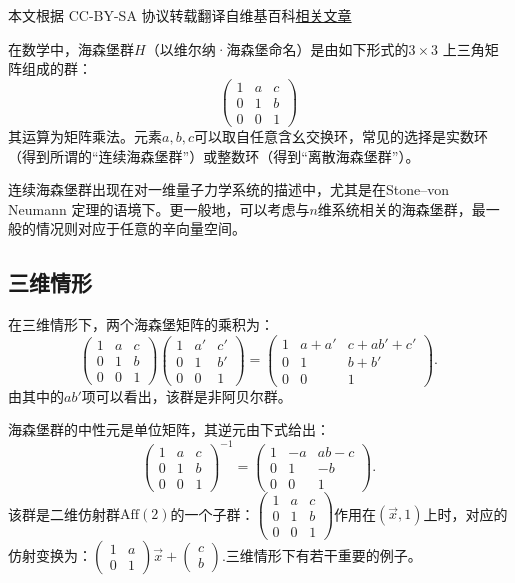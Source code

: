
本文根据 CC-BY-SA 协议转载翻译自维基百科\href{https://en.wikipedia.org/wiki/Heisenberg_group}{相关文章}

在数学中，海森堡群$H$（以维尔纳·海森堡命名）是由如下形式的$3 \times 3$ 上三角矩阵组成的群：
$$
\begin{pmatrix}
1 & a & c \\
0 & 1 & b \\
0 & 0 & 1
\end{pmatrix}~
$$
其运算为矩阵乘法。元素$a, b, c$可以取自任意含幺交换环，常见的选择是实数环（得到所谓的“连续海森堡群”）或整数环（得到“离散海森堡群”）。

连续海森堡群出现在对一维量子力学系统的描述中，尤其是在Stone–von Neumann 定理的语境下。更一般地，可以考虑与$n$维系统相关的海森堡群，最一般的情况则对应于任意的辛向量空间。
\subsection{三维情形}
在三维情形下，两个海森堡矩阵的乘积为：
$$
\begin{pmatrix}
1 & a & c \\
0 & 1 & b \\
0 & 0 & 1
\end{pmatrix}
\begin{pmatrix}
1 & a' & c' \\
0 & 1 & b' \\
0 & 0 & 1
\end{pmatrix}
=
\begin{pmatrix}
1 & a + a' & c + ab' + c' \\
0 & 1 & b + b' \\
0 & 0 & 1
\end{pmatrix}.~
$$
由其中的$ab'$项可以看出，该群是非阿贝尔群。

海森堡群的中性元是单位矩阵，其逆元由下式给出：
$$
\begin{pmatrix}
1 & a & c \\
0 & 1 & b \\
0 & 0 & 1
\end{pmatrix}^{-1}
=
\begin{pmatrix}
1 & -a & ab - c \\
0 & 1 & -b \\
0 & 0 & 1
\end{pmatrix}.~
$$
该群是二维仿射群$\mathrm{Aff}(2)$的一个子群：$\begin{pmatrix}1 & a & c \\0 & 1 & b \\0 & 0 & 1\end{pmatrix}$作用在$(\vec{x}, 1)$上时，对应的仿射变换为：$\begin{pmatrix}1 & a \\0 & 1\end{pmatrix} \vec{x} +\begin{pmatrix}c \\b\end{pmatrix}$.三维情形下有若干重要的例子。
